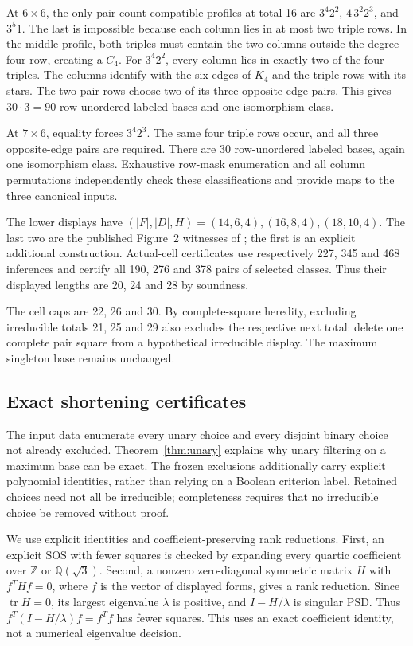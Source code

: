 \documentclass[11pt,a4paper]{article}
\theoremstyle{definition}
\newcommand{\Q}{\mathbb Q}
\newcommand{\Z}{\mathbb Z}
\begin{document}
At $6\times6$, the only pair-count-compatible profiles at total 16 are
$3^4 2^2$, $4\,3^2 2^3$, and $3^5 1$. The last is impossible because
each column lies in at most two triple rows. In the middle profile,
both triples must contain the two columns outside the degree-four row,
creating a $C_4$. For $3^4 2^2$, every column lies in exactly two of the
four triples. The columns identify with the six edges of $K_4$ and the
triple rows with its stars. The two pair rows choose two of its three
opposite-edge pairs. This gives $30\cdot3=90$ row-unordered labeled
bases and one isomorphism class.

At $7\times6$, equality forces $3^4 2^3$. The same four triple rows
occur, and all three opposite-edge pairs are required. There are 30
row-unordered labeled bases, again one isomorphism class. Exhaustive row-mask
enumeration and all column permutations independently check these
classifications and provide maps to the three canonical inputs.

The lower displays have $(|F|,|D|,H)=(14,6,4),(16,8,4),(18,10,4)$.
The last two are the published Figure~2 witnesses of \cite{CCQ}; the
first is an explicit additional construction. Actual-cell certificates
use respectively 227, 345 and 468 inferences and certify all 190, 276
and 378 pairs of selected classes. Thus their displayed lengths are
20, 24 and 28 by soundness.

The cell caps are 22, 26 and 30. By complete-square heredity, excluding
irreducible totals 21, 25 and 29 also excludes the respective next total:
delete one complete pair square from a hypothetical irreducible display.
The maximum singleton base remains unchanged.

\subsection{Exact shortening certificates}

The input data enumerate every unary choice and every disjoint binary
choice not already excluded. Theorem~\ref{thm:unary} explains why unary
filtering on a maximum base can be exact. The frozen exclusions additionally
carry explicit polynomial identities, rather than relying on a Boolean
criterion label. Retained choices need not all be irreducible; completeness
requires that no irreducible choice be removed without proof.

We use explicit identities and coefficient-preserving rank reductions. First, an explicit SOS with fewer
squares is checked by expanding every quartic coefficient over $\Z$ or
$\Q(\sqrt3)$. Second, a nonzero zero-diagonal symmetric matrix $H$ with
$f^THf=0$, where $f$ is the vector of displayed forms, gives a rank
reduction. Since $\operatorname{tr}H=0$, its largest eigenvalue
$\lambda$ is positive, and $I-H/\lambda$ is singular PSD. Thus
$f^T(I-H/\lambda)f=f^Tf$ has fewer squares. This uses an exact
coefficient identity, not a numerical eigenvalue decision.
\end{document}
